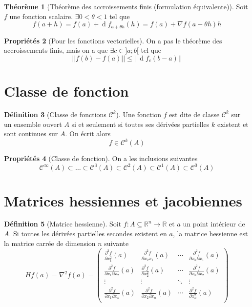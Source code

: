 \documentclass[11pt,a4paper]{article}
\theoremstyle{definition}
\newtheorem{mydef}{Définition}%
\newtheorem{myprop}[mydef]{Propriétés}
\newtheorem{mytheo}[mydef]{Théorème}
\DeclareMathOperator{\diff}{d}
\newcommand{\dif}{\diff\!}
\newcommand{\pa}{\partial}
\newcommand{\R}{\mathbb{R}}
\begin{document}
\begin{mytheo}[Théorème des accroissements finis (formulation équivalente)] Soit $f$ une fonction scalaire. $\exists 0 < \theta < 1$ tel que
	\[ f(a+h) = f(a) + \dif f_{a + \theta h}(h) = f(a) + \nabla f(a + \theta h)h \]
\end{mytheo}

\begin{myprop}[Pour les fonctions vectorielles]
	On a pas le théorème des accroissements finis, mais on a que
	$\exists c \in ]a; b[$ tel que
	\[ || f(b) - f(a) || \leq || \dif f_c(b-a) || \]
\end{myprop}


\section{Classe de fonction}

\begin{mydef}[Classe de fonctions $\mathcal{C}^k$]
	Une fonction $f$ est dite de classe $\mathcal{C}^k$ sur un ensemble ouvert $A$ si et seulement si toutes ses dérivées partielles $k$\ieme{} existent et sont continues sur $A$. On écrit alors
	\[ f \in \mathcal{C}^k(A) \]
\end{mydef}

\begin{myprop}[Classe de fonction] On a les inclusions suivantes
	\[ \mathcal{C}^{\infty}(A) \subset \dots \subset \mathcal{C}^3(A) \subset \mathcal{C}^2(A) \subset \mathcal{C}^1(A) \subset \mathcal{C}^0(A) \]
\end{myprop}


\section{Matrices hessiennes et jacobiennes}

\begin{mydef}[Matrice hessienne]
	Soit $f : A \subseteq \R^n \to \R$ et $a$ un point intérieur de $A$. Si toutes les dérivées partielles secondes existent en $a$, la matrice hessienne est la matrice carrée de dimension $n$ suivante
	\[ Hf(a) = \nabla^2 f(a) = \begin{pmatrix}
		\frac{\pa^2 f}{\pa x_1^2}(a) & \frac{\pa^2 f}{\pa x_2 x_1}(a) & \cdots & \frac{\pa^2 f}{\pa x_n \pa x_1}(a) \\
		\frac{\pa^2 f}{\pa x_1 \pa x_2}(a) & \frac{\pa^2 f}{\pa x_2^2}(a) & \cdots & \frac{\pa^2 f}{\pa x_n \pa x_2}(a) \\
		\vdots & \vdots & \ddots & \vdots \\
		\frac{\pa^2 f}{\pa x_1 \pa x_n}(a) & \frac{\pa^2 f}{\pa x_2 \pa x_n}(a) & \cdots & \frac{\pa^2 f}{\pa x_n^2}(a) \\
	\end{pmatrix} \]
\end{mydef}
\end{document}
